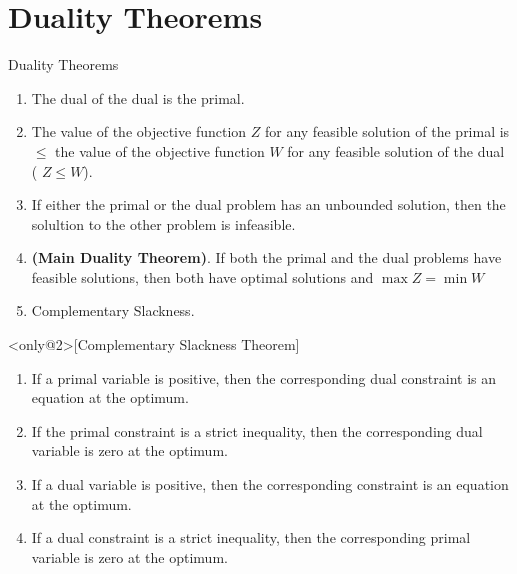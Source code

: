 ﻿
\section{Duality Theorems}
\label{sec:duality-theorems}

\begin{frame}{Duality Theorems}
  \begin{enumerate} \justifying \parskip4mm
\item<only@1> The dual of the dual is the primal.
\item<only@1> The value of the objective function $Z$ for any feasible solution of the primal is $\leq$ the value of the objective function $W$ for any feasible solution of the dual ( $Z \leq W$).
\item<only@1> If either the primal or the dual problem has an unbounded solution, then the solultion to the other problem is infeasible.
\item<only@1> \textbf{(Main Duality Theorem)}. If both the primal and the dual problems have feasible solutions, then both have optimal solutions and  $\max Z = \min W$
\item<only@1> Complementary Slackness.
\end{enumerate}

\begin{theorem}<only@2>[Complementary Slackness Theorem]
  \begin{enumerate} \justifying \parskip2mm
  \item If a \alert{primal variable is positive}, then the corresponding dual constraint is an equation at the optimum.
  \item If the \alert{primal constraint is a strict inequality}, then the corresponding dual variable
    is zero at the optimum.
    
  \item If a \alert{dual variable is positive}, then the corresponding constraint is an equation at the optimum.
  \item If a \alert{dual constraint is a strict inequality}, then the corresponding primal variable is zero at the optimum.
  \end{enumerate}
\end{theorem}
\end{frame}

